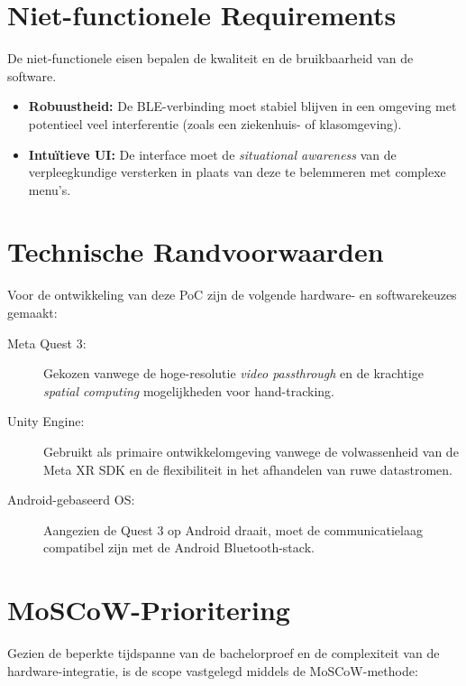 \section{Niet-functionele Requirements}
De niet-functionele eisen bepalen de kwaliteit en de bruikbaarheid van de software.

\begin{itemize}
    \item \textbf{Robuustheid:} De BLE-verbinding moet stabiel blijven in een omgeving met potentieel veel interferentie (zoals een ziekenhuis- of klasomgeving).
    \item \textbf{Intuïtieve UI:} De interface moet de \textit{situational awareness} van de verpleegkundige versterken in plaats van deze te belemmeren met complexe menu's.
\end{itemize}

\section{Technische Randvoorwaarden}
Voor de ontwikkeling van deze PoC zijn de volgende hardware- en softwarekeuzes gemaakt:

\begin{description}
    \item[Meta Quest 3:] Gekozen vanwege de hoge-resolutie \textit{video passthrough} en de krachtige \textit{spatial computing} mogelijkheden voor hand-tracking.
    \item[Unity Engine:] Gebruikt als primaire ontwikkelomgeving vanwege de volwassenheid van de Meta XR SDK en de flexibiliteit in het afhandelen van ruwe datastromen.
    \item[Android-gebaseerd OS:] Aangezien de Quest 3 op Android draait, moet de communicatielaag compatibel zijn met de Android Bluetooth-stack.
\end{description}

\section{MoSCoW-Prioritering}
Gezien de beperkte tijdspanne van de bachelorproef en de complexiteit van de hardware-integratie, is de scope vastgelegd middels de MoSCoW-methode:

